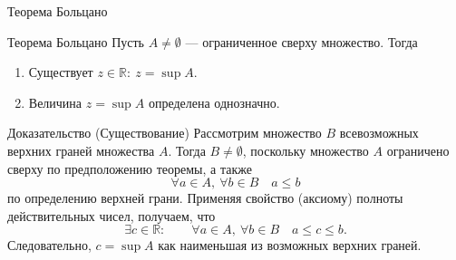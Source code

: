 \documentclass[8pt]{beamer}
\begin{document}

\begin{frame}{Теорема Больцано}

\begin{block}{Теорема Больцано}
Пусть $A\ne\emptyset$ --- ограниченное сверху множество. Тогда
\begin{enumerate}
\item Существует $z\in\mathbb{R}:\ z=\sup A$. 
\item Величина $z=\sup A$ определена однозначно.
\end{enumerate}
\end{block}
\pause

\begin{block}{Доказательство (Существование)}
Рассмотрим множество $B$ всевозможных верхних граней множества $A$. Тогда $B\ne \emptyset$, поскольку множество $A$ ограничено сверху по предположению теоремы, а также
$$\forall a\in A,\ \forall b \in B \quad a \le b$$
по определению верхней грани. Применяя свойство (аксиому) полноты действительных чисел, получаем, что
$$\exists c\in \mathbb{R}: \qquad \forall a\in A,\ \forall b \in B \quad a\le c \le b.$$
Следовательно, $c=\sup A$ как наименьшая из возможных верхних граней.
\end{block}
\end{frame}
\end{document}

